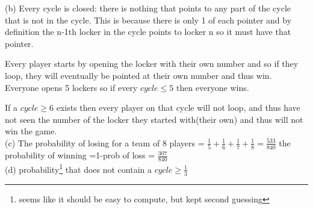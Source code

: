 \documentclass{article}
\newcounter{prob}\setcounter{prob}{1}\newcommand{\prob}{\arabic{prob}.\indent \addtocounter{prob}{1}}
\begin{document}
(b) Every cycle is closed: there is nothing that points to any part of the cycle that is not in the cycle. This is because there is only 1 of each pointer and by  definition the n-1th locker in the cycle points to locker n so it must have that pointer.

Every player starts by opening the locker with their own number and so if they loop, they will eventually be pointed at their own number and thus win. Everyone opens 5 lockers so if every $cycle \leq 5$ then everyone wins.

If a $cycle \geq 6$ exists then every player on that cycle will not loop, and 
thus have not seen the number of the locker they started with(their own) and thus will not win the game.\\

(c) The probability of losing for a team of 8 players = $\frac{1}{5}+\frac{1}{6}+\frac{1}{7}+\frac{1}{8}=\frac{533}{840}$
the probability of winning =1-prob of loss = $\frac{307}{840}$\\

(d) probability\footnote{seems like it should be easy to compute, but kept second guessing} that does not contain a $cycle \geq \frac{1}{3}$ 
\end{document}
